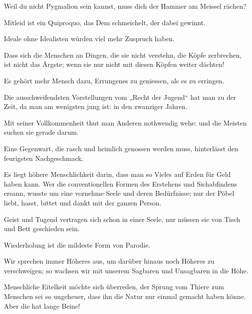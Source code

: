 Weil du nicht Pygmalion sein kannst, muss dich der Hammer am Meissel rächen?
\par

Mitleid ist ein Quiproquo, das Dem schmeichelt, der dabei gewinnt.
\par

Ideale ohne Idealisten würden viel mehr Zuspruch haben.
\par

Dass sich die Menschen an Dingen, die sie nicht verstehn, die Köpfe zerbrechen, ist nicht das Ärgste; wenn sie nur nicht mit diesen Köpfen weiter dächten!
\par

Es gehört mehr Mensch dazu, Errungenes zu geniessen, als es zu erringen.
\par

Die ausschweifendsten Vorstellungen vom „Recht der Jugend“ hat man zu der Zeit, da man am wenigsten jung ist: in den zwanziger Jahren.
\par

Mit seiner Vollkommenheit thut man Anderen nothwendig wehe: und die Meisten suchen sie gerade darum.
\par

Eine Gegenwart, die rasch und heimlich genossen werden muss, hinterlässt den feurigsten Nachgeschmack.
\par

Es liegt höhere Menschlichkeit darin, dass man so Vieles auf Erden für Geld haben kann. Wer die conventionellen Formen des Erstehens und Sichabfindens ersann, wusste um eine vornehme Seele und deren Bedürfnisse; nur der Pöbel liebt, hasst, bittet und dankt mit der ganzen Person.
\par

Geist und Tugend vertragen sich schon in einer Seele, nur müssen sie von Tisch und Bett geschieden sein.
\par

Wiederholung ist die mildeste Form von Parodie.
\par

Wir sprechen immer Höheres aus, um darüber hinaus noch Höheres zu verschweigen; so wachsen wir mit unserem Sagbaren und Unsagbaren in die Höhe.
\par

Menschliche Eitelkeit möchte sich überreden, der Sprung vom Thiere zum Menschen sei so ungeheuer, dass ihn die Natur nur einmal gemacht haben könne. Aber die hat lange Beine!
\par

